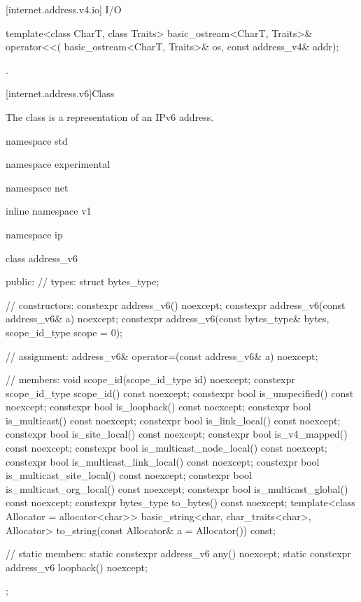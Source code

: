 [internet.address.v4.io]{ I/O}

\begin{itemdecl}
template<class CharT, class Traits>
  basic_ostream<CharT, Traits>& operator<<(
    basic_ostream<CharT, Traits>& os, const address_v4& addr);
\end{itemdecl}

\begin{itemdescr}
\pnum
\returns {}.
\end{itemdescr}




[internet.address.v6]{Class }

\pnum
The class  is a representation of an IPv6 address.

\begin{codeblock}
namespace std {
namespace experimental {
namespace net {
inline namespace v1 {
namespace ip {

  class address_v6
  {
  public:
    // types:
    struct bytes_type;

    // constructors:
    constexpr address_v6() noexcept;
    constexpr address_v6(const address_v6& a) noexcept;
    constexpr address_v6(const bytes_type& bytes,
                         scope_id_type scope = 0);

    // assignment:
    address_v6& operator=(const address_v6& a) noexcept;

    // members:
    void scope_id(scope_id_type id) noexcept;
    constexpr scope_id_type scope_id() const noexcept;
    constexpr bool is_unspecified() const noexcept;
    constexpr bool is_loopback() const noexcept;
    constexpr bool is_multicast() const noexcept;
    constexpr bool is_link_local() const noexcept;
    constexpr bool is_site_local() const noexcept;
    constexpr bool is_v4_mapped() const noexcept;
    constexpr bool is_multicast_node_local() const noexcept;
    constexpr bool is_multicast_link_local() const noexcept;
    constexpr bool is_multicast_site_local() const noexcept;
    constexpr bool is_multicast_org_local() const noexcept;
    constexpr bool is_multicast_global() const noexcept;
    constexpr bytes_type to_bytes() const noexcept;
    template<class Allocator = allocator<char>>
      basic_string<char, char_traits<char>, Allocator>
        to_string(const Allocator& a = Allocator()) const;

    // static members:
    static constexpr address_v6 any() noexcept;
    static constexpr address_v6 loopback() noexcept;
  };

}}}}}
\end{codeblock}
